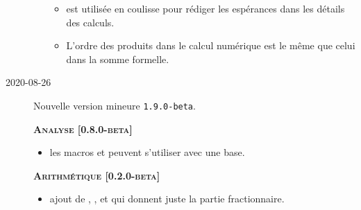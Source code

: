 \documentclass[12pt,a4paper]{book}
\begin{document}
\begin{description}
\begin{itemize}[itemsep=.5em]
        \begin{itemize}[itemsep=.5em]
            \item {} est utilisée en coulisse pour rédiger les espérances dans les détails des calculs.
            
    		\item L'ordre des produits dans le calcul numérique est le même que celui dans la somme formelle.
        \end{itemize}
    \end{itemize}
    
    
    \separation


    \medskip
    \item[2020-08-26] Nouvelle version mineure \verb+1.9.0-beta+.
    
    
    
    
    \begin{center}
        \textbf{\textsc{Analyse [0.8.0-beta]}}
    \end{center}
    
    \begin{itemize}[itemsep=.5em]
        \item {}
              les macros  et  peuvent s'utiliser avec une base.
        
    \end{itemize}
    
    
    \separation
    
    
    
    
    \begin{center}
        \textbf{\textsc{Arithmétique [0.2.0-beta]}}
    \end{center}
    
    \begin{itemize}[itemsep=.5em]
        \item {}
        	  ajout de , ,  et  qui donnent juste la partie fractionnaire.
    \end{itemize}
    
    
    \separation
    
    
    

\end{description}
\end{document}
